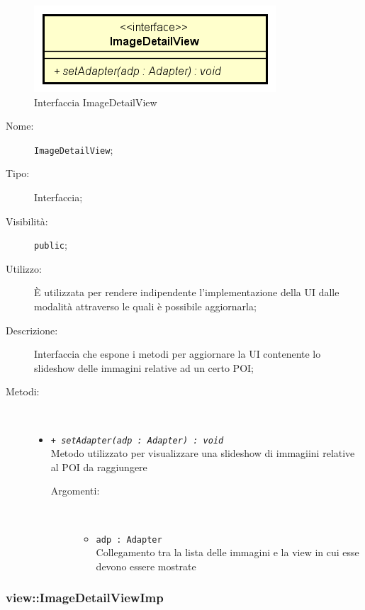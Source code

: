 \documentclass[../DefinizioneDiProdotto.tex]{subfiles}
\begin{document}
    \begin{figure}[H]
        \centering
        \includegraphics{img/ImageDetailView.png}
        \caption{Interfaccia ImageDetailView}\label{fig:view::ImageDetailView} 
    \end{figure}
    \begin{description}
\item[Nome:] \texttt{ImageDetailView};
\item[Tipo:] Interfaccia;
\item[Visibilità:] \texttt{public};
\item[Utilizzo:] È utilizzata per rendere indipendente l'implementazione della UI dalle modalità attraverso le quali è possibile aggiornarla;
\item[Descrizione:] Interfaccia che espone i metodi per aggiornare la UI contenente lo slideshow delle immagini relative ad un certo POI;
\item[Metodi:] \
\begin{itemize}
\item \texttt{+ \textit{setAdapter(adp : Adapter) : void}}\\
Metodo utilizzato per visualizzare una slideshow di immagiini relative al POI da raggiungere
 \begin{description}
\item[Argomenti:] \
\begin{itemize}
\item \texttt{adp : Adapter}\\
Collegamento tra la lista delle immagini e la view in cui esse devono essere mostrate\end{itemize}
\end{description}
\end{itemize}
\end{description}

\subsubsection{view::ImageDetailViewImp}
\end{document}
